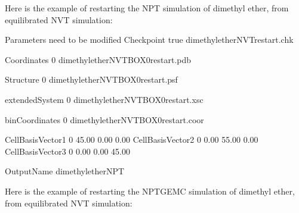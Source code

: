 \documentclass[letterpaper,10pt,english]{sphinxmanual}
\begin{document}
\sphinxAtStartPar
Here is the example of restarting the NPT simulation of dimethyl ether, from equilibrated NVT simulation:

\begin{sphinxVerbatim}[commandchars=\\\{\}]
\PYGZsh{}\PYGZsh{}\PYGZsh{}\PYGZsh{}\PYGZsh{}\PYGZsh{}\PYGZsh{}\PYGZsh{}\PYGZsh{}\PYGZsh{}\PYGZsh{}\PYGZsh{}\PYGZsh{}\PYGZsh{}\PYGZsh{}\PYGZsh{}\PYGZsh{}\PYGZsh{}\PYGZsh{}\PYGZsh{}\PYGZsh{}\PYGZsh{}\PYGZsh{}\PYGZsh{}\PYGZsh{}\PYGZsh{}\PYGZsh{}\PYGZsh{}\PYGZsh{}\PYGZsh{}\PYGZsh{}\PYGZsh{}\PYGZsh{}\PYGZsh{}\PYGZsh{}\PYGZsh{}\PYGZsh{}\PYGZsh{}\PYGZsh{}\PYGZsh{}\PYGZsh{}\PYGZsh{}\PYGZsh{}\PYGZsh{}\PYGZsh{}\PYGZsh{}\PYGZsh{}\PYGZsh{}\PYGZsh{}\PYGZsh{}\PYGZsh{}\PYGZsh{}\PYGZsh{}\PYGZsh{}\PYGZsh{}\PYGZsh{}
\PYGZsh{} Parameters need to be modified
\PYGZsh{}\PYGZsh{}\PYGZsh{}\PYGZsh{}\PYGZsh{}\PYGZsh{}\PYGZsh{}\PYGZsh{}\PYGZsh{}\PYGZsh{}\PYGZsh{}\PYGZsh{}\PYGZsh{}\PYGZsh{}\PYGZsh{}\PYGZsh{}\PYGZsh{}\PYGZsh{}\PYGZsh{}\PYGZsh{}\PYGZsh{}\PYGZsh{}\PYGZsh{}\PYGZsh{}\PYGZsh{}\PYGZsh{}\PYGZsh{}\PYGZsh{}\PYGZsh{}\PYGZsh{}\PYGZsh{}\PYGZsh{}\PYGZsh{}\PYGZsh{}\PYGZsh{}\PYGZsh{}\PYGZsh{}\PYGZsh{}\PYGZsh{}\PYGZsh{}\PYGZsh{}\PYGZsh{}\PYGZsh{}\PYGZsh{}\PYGZsh{}\PYGZsh{}\PYGZsh{}\PYGZsh{}\PYGZsh{}\PYGZsh{}\PYGZsh{}\PYGZsh{}\PYGZsh{}\PYGZsh{}\PYGZsh{}\PYGZsh{}
Checkpoint   true   dimethylether\PYGZus{}NVT\PYGZus{}restart.chk

Coordinates     0   dimethylether\PYGZus{}NVT\PYGZus{}BOX\PYGZus{}0\PYGZus{}restart.pdb

Structure       0   dimethylether\PYGZus{}NVT\PYGZus{}BOX\PYGZus{}0\PYGZus{}restart.psf

extendedSystem   0   dimethylether\PYGZus{}NVT\PYGZus{}BOX\PYGZus{}0\PYGZus{}restart.xsc

binCoordinates   0   dimethylether\PYGZus{}NVT\PYGZus{}BOX\PYGZus{}0\PYGZus{}restart.coor

\PYGZsh{}CellBasisVector1   0       45.00   0.00    0.00
\PYGZsh{}CellBasisVector2   0       0.00    55.00   0.00
\PYGZsh{}CellBasisVector3   0       0.00    0.00    45.00

OutputName          dimethylether\PYGZus{}NPT
\end{sphinxVerbatim}

\sphinxAtStartPar
Here is the example of restarting the NPT\sphinxhyphen{}GEMC simulation of dimethyl ether, from equilibrated NVT simulation:
\end{document}
